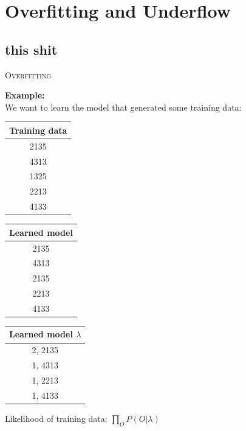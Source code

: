 \section{Overfitting and Underflow}
\subsection{this shit}
\begin{frame}
\center \huge \scshape Overfitting
\end{frame}

\begin{frame}
\center
\textbf{Example:}
\\
We want to learn the model that generated some training data:\\
\begin{table}[h]
\begin{tabular}{c}
\multicolumn{1}{l}{\textbf{Training data}} \\ \hline
\multicolumn{1}{|c|}{2135}    \\ \hline
\multicolumn{1}{|c|}{4313}    \\ \hline
\multicolumn{1}{|c|}{1325}    \\ \hline
\multicolumn{1}{|c|}{2213}    \\ \hline
\multicolumn{1}{|c|}{4133}    \\ \hline
\end{tabular}
\end{table}
\end{frame}

\begin{frame}
\begin{table}[h]
\begin{tabular}{c}
\multicolumn{1}{l}{\textbf{Learned model}} \\ \hline
\multicolumn{1}{|c|}{2135}    \\ \hline
\multicolumn{1}{|c|}{4313}    \\ \hline
\multicolumn{1}{|c|}{2135}    \\ \hline
\multicolumn{1}{|c|}{2213}    \\ \hline
\multicolumn{1}{|c|}{4133}    \\ \hline
\end{tabular}
\end{table}
\end{frame}

\begin{frame}
\begin{table}[h]
\begin{tabular}{c}
\multicolumn{1}{l}{\textbf{Learned model $\lambda$}} \\ \hline
\multicolumn{1}{|c|}{2, 2135}    \\ \hline
\multicolumn{1}{|c|}{1, 4313}    \\ \hline
\multicolumn{1}{|c|}{1, 2213}    \\ \hline
\multicolumn{1}{|c|}{1, 4133}    \\ \hline
\end{tabular}
\end{table}
\center
Likelihood of training data: $\prod\limits_O P(O | \lambda)$
\end{frame}

